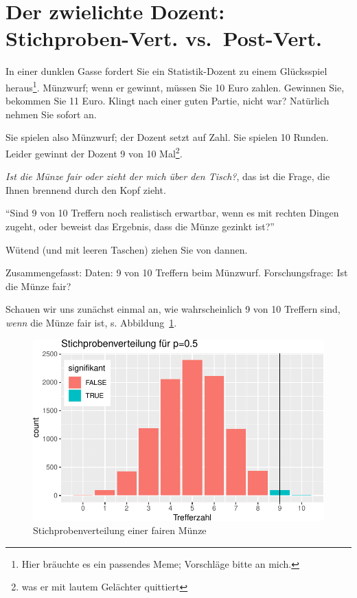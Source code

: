 \documentclass[
  a4paper,
  DIV=11]{scrreprt}
\theoremstyle{definition}
\theoremstyle{remark}
\begin{document}
\hypertarget{der-zwielichte-dozent-stichproben-vert.-vs.-post-vert.}{%
\section{Der zwielichte Dozent: Stichproben-Vert.
vs.~Post-Vert.}\label{der-zwielichte-dozent-stichproben-vert.-vs.-post-vert.}}

In einer dunklen Gasse fordert Sie ein Statistik-Dozent zu einem
Glücksspiel heraus\footnote{Hier bräuchte es ein passendes Meme;
  Vorschläge bitte an mich.}. Münzwurf; wenn er gewinnt, müssen Sie 10
Euro zahlen. Gewinnen Sie, bekommen Sie 11 Euro. Klingt nach einer guten
Partie, nicht war? Natürlich nehmen Sie sofort an.

Sie spielen also Münzwurf; der Dozent setzt auf Zahl. Sie spielen 10
Runden. Leider gewinnt der Dozent 9 von 10 Mal\footnote{was er mit
  lautem Gelächter quittiert}.

\emph{Ist die Münze fair oder zieht der mich über den Tisch?}, das ist
die Frage, die Ihnen brennend durch den Kopf zieht.

``Sind 9 von 10 Treffern noch realistisch erwartbar, wenn es mit rechten
Dingen zugeht, oder beweist das Ergebnis, dass die Münze gezinkt ist?''

Wütend (und mit leeren Taschen) ziehen Sie von dannen.

Zusammengefasst: Daten: 9 von 10 Treffern beim Münzwurf.
Forschungsfrage: Ist die Münze fair?

Schauen wir uns zunächst einmal an, wie wahrscheinlich 9 von 10 Treffern
sind, \emph{wenn} die Münze fair ist, s. Abbildung~\ref{fig-stiprovert}.

\begin{figure}

{\centering \includegraphics{./ppv_files/figure-pdf/fig-stiprovert-1.pdf}

}

\caption{\label{fig-stiprovert}Stichprobenverteilung einer fairen Münze}

\end{figure}
\end{document}
